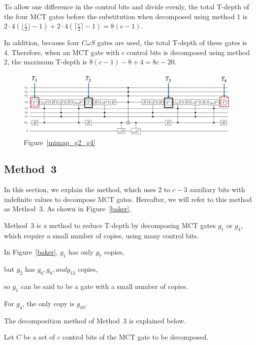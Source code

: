 To allow one difference in the control bits and divide evenly,
the total T-depth of the four MCT gates before the substitution when decomposed using method 1 is
$2 \cdot 4(\lfloor \frac{c}{2} \rfloor -1) +2\cdot 4(\lceil \frac{c}{2} \rceil -1)=8(c-1)$.

In addition, because four $C\omega S$ gates are used, the total T-depth of these gates is $4$. 
Therefore, when an MCT gate with $c$ control bits is decomposed using method 2, the maximum T-depth is $8(c-1)-8+4=8c-20$.
\begin{figure}[tbp]
\centering
\includegraphics[width=0.95\linewidth]{img/mimap_g2_g4_transform.pdf}
\caption{Figure~\ref{mimap_g2_g4}}
\label{mimap_g2_g4_trans}
\end{figure}
\subsection{Method~3}
In this section, we explain the method\cite{baker2019decomposing}, which uses 2 to $c-3$ auxiliary bits with indefinite values to decompose MCT gates.
Hereafter, we will refer to this method as Method~3.
As shown in Figure~\ref{baker},

Method~3 is a method to reduce T-depth by decomposing MCT gates $g_{1}$ or $g_{4}$, which require a small number of copies, using many control bits.

In Figure~\ref{baker}, $g_{1}$ has only $g_{7}$ copies,

but $g_{2}$ has $g_{6}, g_{8}, and g_{13}$ copies,

so $g_{1}$ can be said to be a gate with a small number of copies.

For $g_{4}$, the only copy is $g_{10}$.

\par
The decomposition method of Method~3 is explained below.

Let $C$ be a set of $c$ control bits of the MCT gate to be decomposed.

